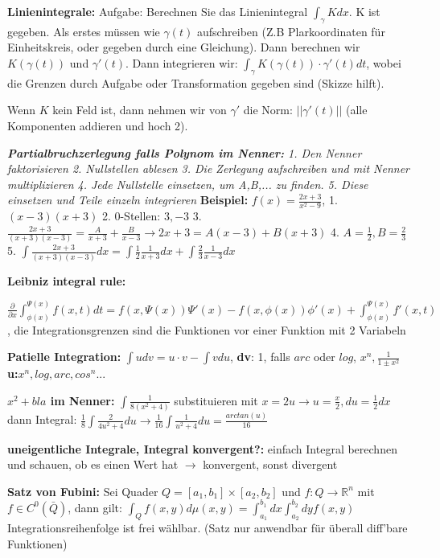 \documentclass[a3paper, ngerman, 8pt]{article}
\begin{document}
\begin{multicols*}{3}
\textbf{Linienintegrale:} Aufgabe: Berechnen Sie das Linienintegral $\int_{\gamma} Kdx$. K ist gegeben. Als erstes müssen wie $\gamma (t)$ aufschreiben (Z.B Plarkoordinaten für Einheitskreis, oder gegeben durch eine Gleichung). Dann berechnen wir $K(\gamma (t))$ und $\gamma ' (t)$. Dann integrieren wir: $\int_{\gamma} K(\gamma (t))\cdot \gamma ' (t)dt$, wobei die Grenzen durch Aufgabe oder Transformation gegeben sind (Skizze hilft).

Wenn $K$ kein Feld ist, dann nehmen wir von $\gamma '$ die Norm: $\vert \vert \gamma ' (t)\vert \vert$ (alle Komponenten addieren und hoch 2).

\textit{\textbf{Partialbruchzerlegung falls Polynom im Nenner:} 1. Den Nenner faktorisieren 2. Nullstellen ablesen 3. Die Zerlegung aufschreiben und mit Nenner multiplizieren 4. Jede Nullstelle einsetzen, um A,B,... zu finden. 5. Diese einsetzen und Teile einzeln integrieren}
\textbf{Beispiel: }$f(x)=\frac{2x+3}{x^2-9}$, 1. $(x-3)(x+3)$ 2. 0-Stellen: $3, -3$ 3. $\frac{2x+3}{(x+3)(x-3)}=\frac{A}{x+3}+ \frac{B}{x-3} \to 2x+3=A(x-3)+B(x+3)$ 4. $A=\frac{1}{2}, B=\frac{2}{3}$ 5. $\int\frac{2x+3}{(x+3)(x-3)}dx=\int\frac{1}{2}\frac{1}{x+3}dx+ \int\frac{2}{3}\frac{1}{x-3}dx$

\textbf{Leibniz integral rule:} 

$\frac{\partial}{\partial x}\int_{\phi (x)}^{\Psi (x)}f(x,t)dt= f(x, \Psi(x))\Psi'(x)-f(x, \phi (x))\phi'(x)+\int_{\phi (x)}^{\Psi(x)}f'(x, t)$, die Integrationsgrenzen sind die Funktionen vor einer Funktion mit 2 Variabeln

\textbf{Patielle Integration:} $\int u dv=u\cdot v -\int v du$, \textbf{dv}: 1, falls $arc$ oder $log$, $x^n, \frac{1}{1\pm x^2}$
\textbf{u:}$x^n, log, arc, cos^n... $


\textbf{$x^2 + bla$ im Nenner:} $\int \frac{1}{8(x^2+4)}$ substituieren mit $x=2u \to u=\frac{x}{2}, du = \frac{1}{2}dx$ dann Integral: $\frac{1}{8}\int \frac{2}{4u^2+4}du \to \frac{1}{16} \int \frac{1}{u^2+4}du= \frac{arctan(u)}{16}$

\textbf{uneigentliche Integrale, Integral konvergent?:} einfach Integral berechnen und schauen, ob es einen Wert hat $\to$ konvergent, sonst divergent

\textbf{Satz von Fubini:} Sei Quader $Q=[a_1, b_1]\times[a_2, b_2]$ und $f: Q \to \mathbb{R}^n$ mit $f \in C^0(\bar{Q})$, dann gilt: $\int_Q f(x,y)d\mu (x, y)= \int_{a_1}^{b_1}dx\int_{a_2}^{b_2}dy f(x,y)$ Integrationsreihenfolge ist frei wählbar. (Satz nur anwendbar für überall diff'bare Funktionen)


\end{multicols*}
\end{document}
